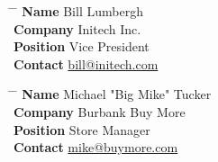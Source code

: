 \documentclass[10pt]{article} %
\begin{document}
\parbox{0.5\textwidth}{ %
\begin{tabbing}
\hspace{2.75cm} \= \hspace{4cm} \= \kill %
{\bf Name} \> Bill Lumbergh \\ %
{\bf Company} \> Initech Inc. \\ %
{\bf Position} \> Vice President \\ %
{\bf Contact} \> \href{mailto:bill@initech.com}{bill@initech.com} %
\end{tabbing}}
\hfill %
\parbox{0.5\textwidth}{ %
\begin{tabbing}
\hspace{2.75cm} \= \hspace{4cm} \= \kill %
{\bf Name} \> Michael "Big Mike" Tucker\\ %
{\bf Company} \> Burbank Buy More \\ %
{\bf Position} \> Store Manager \\ %
{\bf Contact} \> \href{mailto:mike@buymore.com}{mike@buymore.com} %
\end{tabbing}}

\end{document}
